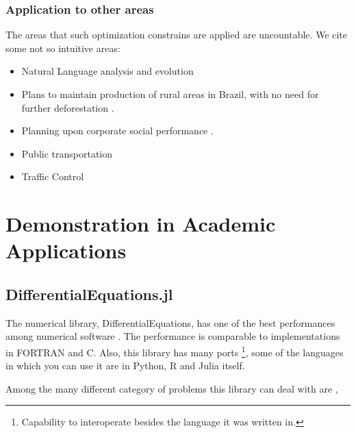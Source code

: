 \documentclass[
12pt,				%
openright,			%
oneside,			%
a4paper,			%
brazil,				%
english,			  %
]{abntex2}
\begin{document}
\subsubsection{Application to other areas}

The areas that such optimization constrains are applied are
uncountable. We cite some not so intuitive areas:

\begin{itemize}
\item Natural Language analysis and evolution \cite{potts2010harmonic,
  heinz2018computational}
\item Plans to maintain production of rural areas in Brazil, with no
  need for further deforestation \cite{costa2018socio}.
\item Planning upon corporate social performance
  \cite{chen2011measuring,jacobs2016operational}.
\item Public transportation \cite{schiewe2020integrated} 
\item Traffic Control \cite{delle2019feedback}
\end{itemize}

\section{Demonstration in Academic Applications}

\subsection{DifferentialEquations.jl}

The numerical library, DifferentialEquations, has one of the best
performances among numerical software
\cite{rackauckas2017differentialequations}. The performance is
comparable to implementations in FORTRAN and C. Also, this library has
many ports \footnote{Capability to interoperate besides the language it
was written in.}, some of the languages in which you can use it are in Python, R and Julia itself.

Among the many different category of problems this library can deal
with are \cite{rackauckas2019confederated,rackauckas2017adaptive,rackauckas_stability-optimized_2018,sykora2020stochasticdelaydiffeq,rackauckas2018comparison,rackauckas2019diffeqflux,rackauckas2020universal,gowda2019sparsity,ma2021modelingtoolkit},
\end{document}
